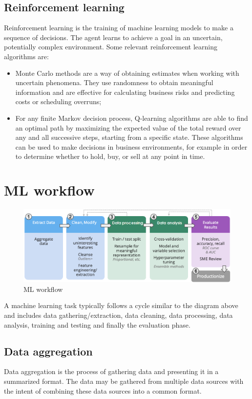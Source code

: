 \subsection{Reinforcement learning}
Reinforcement learning is the training of machine learning models to make a sequence of decisions. The agent learns to achieve a goal in an uncertain, potentially complex environment. \cite{reinforcementlearning} Some relevant reinforcement learning algorithms are:
\begin{itemize} 
\item Monte Carlo methods are a way of obtaining estimates when working with uncertain phenomena. They use randomness to obtain meaningful information and are effective for calculating business risks and predicting costs or scheduling overruns;
\item For any finite Markov decision process, Q-learning algorithms are able to find an optimal path by maximizing the expected value of the total reward over any and all successive steps, starting from a specific state. These algorithms can be used to make decisions in business environments, for example in order to determine whether to hold, buy, or sell at any point in time.
\end{itemize}


\section{ML workflow}

\begin{figure}[H]
	\centering
	\includegraphics[scale=0.8]{img/mlworkflow.png}
	\caption{ML workflow}
\end{figure} 

A machine learning task typically follows a cycle similar to the diagram above \cite{mlworkflow} and includes data gathering/extraction, data cleaning, data processing, data analysis, training and testing and finally the evaluation phase.


\subsection{Data aggregation}
Data aggregation is the process of gathering data and presenting it in a summarized format. The data may be gathered from multiple data sources with the intent of combining these data sources into a common format.


